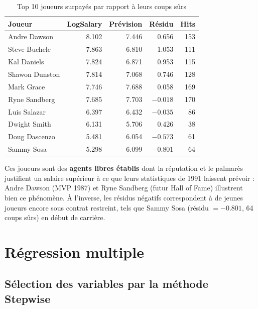 \documentclass[11pt,a4paper]{article}
\begin{document}
\begin{table}[H]
\centering
\caption{Top 10 joueurs surpayés par rapport à leurs coups sûrs}
\label{tab:outliers}
\small
\begin{tabular}{lrrrr}
\toprule
\textbf{Joueur} & \textbf{LogSalary} & \textbf{Prévision} & \textbf{Résidu} & \textbf{Hits} \\
\midrule
Andre Dawson    & 8.102 & 7.446 & 0.656    & 153 \\
Steve Buchele   & 7.863 & 6.810 & 1.053    & 111 \\
Kal Daniels     & 7.824 & 6.871 & 0.953    & 115 \\
Shawon Dunston  & 7.814 & 7.068 & 0.746    & 128 \\
Mark Grace      & 7.746 & 7.688 & 0.058    & 169 \\
Ryne Sandberg   & 7.685 & 7.703 & $-0.018$ & 170 \\
Luis Salazar    & 6.397 & 6.432 & $-0.035$ & 86  \\
Dwight Smith    & 6.131 & 5.706 & 0.426    & 38  \\
Doug Dascenzo   & 5.481 & 6.054 & $-0.573$ & 61  \\
Sammy Sosa      & 5.298 & 6.099 & $-0.801$ & 64  \\
\bottomrule
\end{tabular}
\end{table}

Ces joueurs sont des \textbf{agents libres établis} dont la réputation et le
palmarès justifient un salaire supérieur à ce que leurs statistiques de 1991
laissent prévoir : Andre Dawson (MVP 1987) et Ryne Sandberg (futur Hall of
Fame) illustrent bien ce phénomène. À l'inverse, les résidus négatifs
correspondent à de jeunes joueurs encore sous contrat restreint, tels que
Sammy Sosa (résidu $= -0.801$, 64 coups sûrs) en début de carrière.

\section{Régression multiple}

\subsection{Sélection des variables par la méthode Stepwise}
\end{document}
